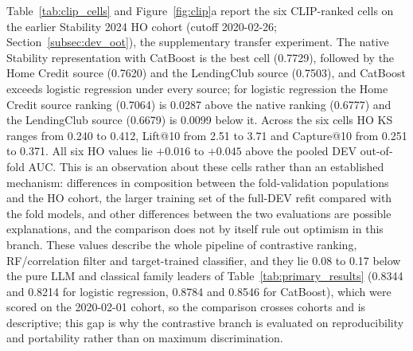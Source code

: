 \documentclass[final,5p,twocolumn]{elsarticle}
\begin{document}
Table~\ref{tab:clip_cells} and Figure~\ref{fig:clip}a report the six CLIP-ranked cells on the earlier Stability 2024 HO cohort (cutoff 2020-02-26; Section~\ref{subsec:dev_oot}), the supplementary transfer experiment. The native Stability representation with CatBoost is the best cell (0.7729), followed by the Home Credit source (0.7620) and the LendingClub source (0.7503), and CatBoost exceeds logistic regression under every source; for logistic regression the Home Credit source ranking (0.7064) is 0.0287 above the native ranking (0.6777) and the LendingClub source (0.6679) is 0.0099 below it. Across the six cells HO KS ranges from 0.240 to 0.412, Lift@10 from 2.51 to 3.71 and Capture@10 from 0.251 to 0.371. All six HO values lie $+0.016$ to $+0.045$ above the pooled DEV out-of-fold AUC. This is an observation about these cells rather than an established mechanism: differences in composition between the fold-validation populations and the HO cohort, the larger training set of the full-DEV refit compared with the fold models, and other differences between the two evaluations are possible explanations, and the comparison does not by itself rule out optimism in this branch. These values describe the whole pipeline of contrastive ranking, RF/correlation filter and target-trained classifier, and they lie 0.08 to 0.17 below the pure LLM and classical family leaders of Table~\ref{tab:primary_results} (0.8344 and 0.8214 for logistic regression, 0.8784 and 0.8546 for CatBoost), which were scored on the 2020-02-01 cohort, so the comparison crosses cohorts and is descriptive; this gap is why the contrastive branch is evaluated on reproducibility and portability rather than on maximum discrimination.
\end{document}
